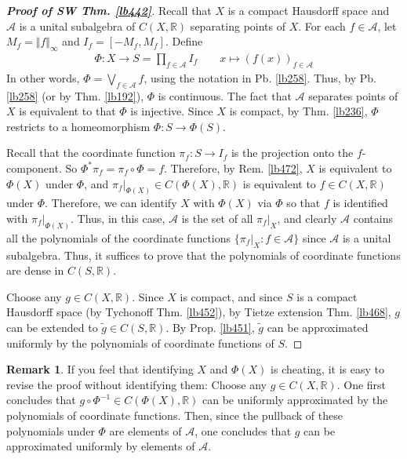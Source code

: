 \documentclass[12pt,b5paper,notitlepage]{article}
\theoremstyle{definition}
\newtheorem{rem}[df]{Remark}
\theoremstyle{plain}
\newcommand{\wtd}{\widetilde}
\newcommand{\scr}{\mathscr}
\newcommand{\Rbb}{\mathbb R}
\numberwithin{equation}{section}
\begin{document}
\begin{proof}[\textbf{Proof of SW Thm. \ref{lb442}}]
Recall that $X$ is a compact Hausdorff space and $\scr A$ is a unital subalgebra of $C(X,\Rbb)$ separating points of $X$. For each $f\in\scr A$, let $M_f=\Vert f\Vert_\infty$ and $I_f=[-M_f,M_f]$. Define
\begin{gather*}
\Phi:X\rightarrow S=\prod_{f\in\scr A}I_f\qquad x\mapsto (f(x))_{f\in\scr A}
\end{gather*}
In other words, $\Phi=\bigvee_{f\in\scr A}f$, using the notation in Pb. \ref{lb258}. Thus, by Pb. \ref{lb258} (or by Thm. \ref{lb192}), $\Phi$ is continuous. The fact that $\scr A$ separates points of $X$ is equivalent to that $\Phi$ is injective. Since $X$ is compact, by Thm. \ref{lb236}, $\Phi$ restricts to a homeomorphism $\Phi:S\rightarrow\Phi(S)$. 

Recall that the coordinate function $\pi_f:S\rightarrow I_f$ is the projection onto the $f$-component. So $\Phi^*\pi_f=\pi_f\circ\Phi=f$. Therefore, by Rem. \ref{lb472}, $X$ is equivalent to $\Phi(X)$ under $\Phi$, and $\pi_f|_{\Phi(X)}\in C(\Phi(X),\Rbb)$ is equivalent to $f\in C(X,\Rbb)$ under $\Phi$. Therefore, we can identify $X$ with $\Phi(X)$ via $\Phi$ so that $f$ is identified with $\pi_f|_{\Phi(X)}$. Thus, in this case, $\scr A$ is the set of all $\pi_f|_X$, and clearly $\scr A$ contains all the polynomials of the coordinate functions $\{\pi_f|_X:f\in\scr A\}$ since $\scr A$ is a unital subalgebra. Thus, it suffices to prove that the polynomials of coordinate functions are dense in $C(S,\Rbb)$. 

Choose any $g\in C(X,\Rbb)$. Since $X$ is compact, and since $S$ is a compact Hausdorff space (by Tychonoff Thm. \ref{lb452}), by Tietze extension Thm. \ref{lb468}, $g$ can be extended to $\wtd g\in C(S,\Rbb)$. By Prop. \ref{lb451}, $\wtd g$ can be approximated uniformly by the polynomials of coordinate functions of $S$.
\end{proof}



\begin{rem}
If you feel that identifying $X$ and $\Phi(X)$ is cheating, it is easy to revise the proof without identifying them: Choose any $g\in C(X,\Rbb)$. One first concludes that $g\circ\Phi^{-1}\in C(\Phi(X),\Rbb)$ can be uniformly approximated by the polynomials of coordinate functions. Then, since the pullback of these polynomials under $\Phi$ are elements of $\scr A$, one concludes that $g$ can be approximated uniformly by elements of $\scr A$.
\end{rem}
\end{document}
